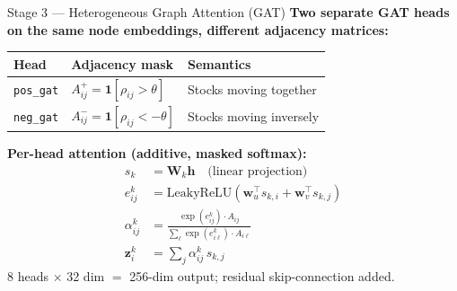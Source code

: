 \documentclass[aspectratio=169, 10pt]{beamer}
\newcommand{\myvec}[1]{\mathbf{#1}}
\begin{document}
\begin{frame}{Stage 3 — Heterogeneous Graph Attention (GAT)}
  \textbf{Two separate GAT heads on the same node embeddings, different adjacency matrices:}

  \begin{center}
  \renewcommand{\arraystretch}{1.4}
  \begin{tabular}{lll}
    \toprule
    \textbf{Head} & \textbf{Adjacency mask} & \textbf{Semantics} \\
    \midrule
    \texttt{pos\_gat} & $A^+_{ij} = \mathbf{1}[\rho_{ij} > \theta]$
                      & \textcolor{positive}{Stocks moving together} \\
    \texttt{neg\_gat} & $A^-_{ij} = \mathbf{1}[\rho_{ij} < -\theta]$
                      & \textcolor{negative}{Stocks moving inversely} \\
    \bottomrule
  \end{tabular}
  \end{center}

  \textbf{Per-head attention (additive, masked softmax):}
  \begin{align*}
    s_k &= \myvec{W}_k \myvec{h} \quad\text{(linear projection)}\\
    e_{ij}^k &= \text{LeakyReLU}\!\left( \myvec{w}_u^\top s_{k,i} + \myvec{w}_v^\top s_{k,j} \right)\\
    \alpha_{ij}^k &= \frac{\exp(e_{ij}^k) \cdot A_{ij}}{\sum_{\ell} \exp(e_{i\ell}^k) \cdot A_{i\ell}}\\
    \myvec{z}_i^k &= \sum_j \alpha_{ij}^k\, s_{k,j}
  \end{align*}
  8 heads $\times$ 32 dim $=$ 256-dim output; residual skip-connection added.
\end{frame}
\end{document}
